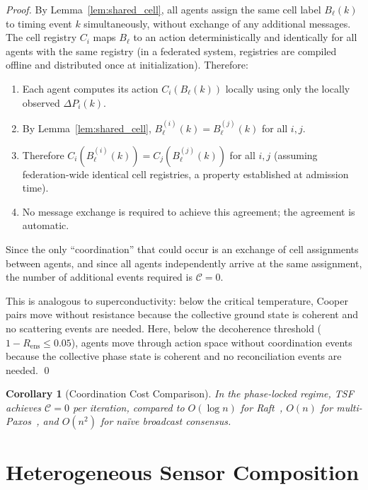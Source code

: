 \documentclass[twocolumn,10pt]{article}
\newtheorem{corollary}[theorem]{Corollary}
\newcommand{\Rens}{R_{\mathrm{ens}}}
\newcommand{\DeltaP}{\Delta P}
\begin{document}
\begin{proof}
By Lemma~\ref{lem:shared_cell}, all agents assign the same cell label
$B_\ell(k)$ to timing event $k$ simultaneously, without exchange of any
additional messages. The cell registry $C_i$ maps $B_\ell$ to an action
deterministically and identically for all agents with the same registry (in a
federated system, registries are compiled offline and distributed once at
initialization). Therefore:

\begin{enumerate}[leftmargin=1em]
\item Each agent computes its action $C_i(B_\ell(k))$ locally using only the
      locally observed $\DeltaP_i(k)$.
\item By Lemma~\ref{lem:shared_cell}, $B_\ell^{(i)}(k) = B_\ell^{(j)}(k)$
      for all $i, j$.
\item Therefore $C_i(B_\ell^{(i)}(k)) = C_j(B_\ell^{(j)}(k))$ for all $i,j$
      (assuming federation-wide identical cell registries, a property
      established at admission time).
\item No message exchange is required to achieve this agreement; the agreement
      is automatic.
\end{enumerate}

Since the only ``coordination'' that could occur is an exchange of cell
assignments between agents, and since all agents independently arrive at the
same assignment, the number of additional events required is $\mathcal{C} = 0$.

This is analogous to superconductivity: below the critical temperature,
Cooper pairs move without resistance because the collective ground state is
coherent and no scattering events are needed. Here, below the decoherence
threshold ($1 - \Rens \leq 0.05$), agents move through action space without
coordination events because the collective phase state is coherent and no
reconciliation events are needed. \qed
\end{proof}

\begin{corollary}[Coordination Cost Comparison]
\label{cor:comparison}
In the phase-locked regime, TSF achieves $\mathcal{C} = 0$ per iteration,
compared to $O(\log n)$ for Raft~\cite{Ongaro2014}, $O(n)$ for
multi-Paxos~\cite{Lamport1998}, and $O(n^2)$ for na{\"i}ve broadcast consensus.
\end{corollary}

\section{Heterogeneous Sensor Composition}
\label{sec:sensors}
\end{document}
